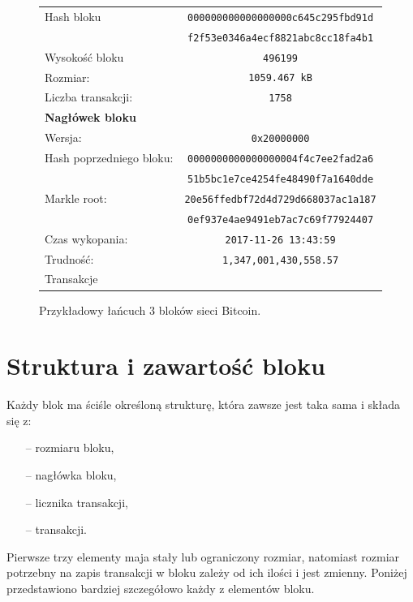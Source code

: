 \documentclass[12pt, twoside, final, openany]{mgr}
\begin{document}
\begin{figure}[H]
 	\begin{center}
	\begin{tabular}{ | l  c | }
		\hline   
     	Hash bloku &\texttt{000000000000000000c645c295fbd91d} \\
    			    & \texttt{f2f53e0346a4ecf8821abc8cc18fa4b1} \\ 
    	Wysokość bloku & \texttt{496199} \\ 
    	Rozmiar: & \texttt{1059.467 kB} \\
    	Liczba transakcji: & \texttt{1758} \\ \hline
		\textbf{Nagłówek bloku} & \\
		Wersja: & \texttt{0x20000000} \\
   	 	Hash poprzedniego bloku: & \texttt{0000000000000000004f4c7ee2fad2a6}\\
   	 							 & \texttt{51b5bc1e7ce4254fe48490f7a1640dde}\\
		Markle root: 			 & \texttt{20e56ffedbf72d4d729d668037ac1a187} \\
								 & \texttt{0ef937e4ae9491eb7ac7c69f77924407} \\
   		Czas wykopania: & \texttt{2017-11-26 13:43:59} \\
   		Trudność: & \texttt{1,347,001,430,558.57}\\
   		\hline
   		Transakcje &\\
   		\hline 
 	\end{tabular}
 	\end{center}
  	\caption{Przykładowy łańcuch 3 bloków sieci Bitcoin.}
	\label{fig:lancuchBlokow}
\end{figure}	

\section{Struktura i zawartość bloku}
\label{zawartoscBloku}
\indent Każdy blok ma ściśle określoną strukturę, która zawsze jest taka sama i składa się z:
\begin{itemize}
\item[--] rozmiaru bloku,
\item[--] nagłówka bloku,
\item[--] licznika transakcji,
\item[--] transakcji.
\end{itemize}

\indent Pierwsze trzy elementy maja stały lub ograniczony rozmiar, natomiast rozmiar potrzebny na zapis transakcji w bloku zależy od ich ilości i jest zmienny. Poniżej przedstawiono bardziej szczegółowo każdy z elementów bloku. 
\end{document}
